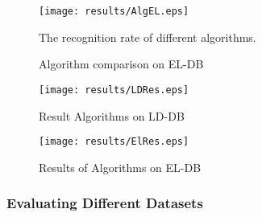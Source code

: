 \begin{figure}
	\centering		
	 \texttt{[image: results/AlgEL.eps]}
	 	\caption{Algorithm comparison on EL-DB} The recognition rate of different algorithms. 
	 	\label{fig:testEL}
\end{figure} 

 
\begin{figure}
	\centering
		\texttt{[image: results/LDRes.eps]}
	\caption{Result Algorithms on LD-DB}
	\label{fig:LDRes}
\end{figure}
\begin{figure}
	\centering
		\texttt{[image: results/ElRes.eps]}
	\caption{Results of Algorithms on EL-DB}
	\label{fig:ElRes}
\end{figure}


\subsubsection {Evaluating Different Datasets}
 \label{sec:EffectsofSymbolComplixity}
 
